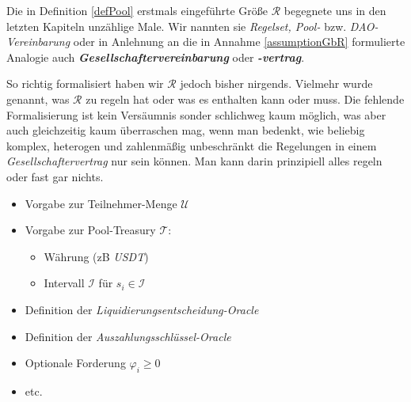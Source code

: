 
Die in Definition \ref{defPool} erstmals eingeführte Größe $\mathcal{R}$ begegnete uns in den letzten Kapiteln unzählige Male. Wir nannten sie \textit{Regelset, Pool-} bzw. \textit{DAO-Vereinbarung} oder in Anlehnung an die in Annahme \ref{assumptionGbR} formulierte Analogie auch \textbf{\textit{Gesellschaftervereinbarung}} oder \textbf{\textit{-vertrag}}. 

\vspace{0.1cm}

So richtig formalisiert haben wir $\mathcal{R}$ jedoch bisher nirgends. Vielmehr wurde genannt, was $\mathcal{R}$ zu regeln hat oder was es enthalten kann oder muss. Die fehlende Formali\-sierung ist kein Versäumnis sonder schlichweg kaum möglich, was aber auch gleichzeitig kaum überraschen mag, wenn man bedenkt, wie beliebig komplex, heterogen und zahlenmäßig unbeschränkt die Regelungen in einem \textit{Gesellschaftervertrag} nur sein können. Man kann darin prinzipiell alles regeln oder fast gar nichts. 

\vspace{0.3cm}


\vspace{0.3cm}


\begin{itemize}
  \item Vorgabe zur Teilnehmer-Menge $\mathcal{U}$
  \item Vorgabe zur Pool-Treasury $\mathcal{T}$:
  \begin{itemize}
  	\item Währung (zB \textit{USDT})
  	\item Intervall $\mathcal{I}$ für $s_i \in \mathcal{I}$
  \end{itemize}
  \item Definition der \textit{Liquidierungsentscheidung-Oracle}
  \item Definition der \textit{Auszahlungsschlüssel-Oracle}
  \item Optionale Forderung $\varphi_i \geq 0$
  \item etc.
\end{itemize}

\vspace{0.5cm}

